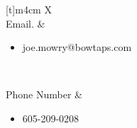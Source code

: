 \begin{center}
\begin{tabularx}{\textwidth}[t]{m{4cm} X}
\hline
{} \\
\hline
Email.  &
\begin{minipage}[t]{\linewidth}%
\begin{itemize}
\item joe.mowry@bowtaps.com\\

\end{itemize} 
\end{minipage}\\

\hline

Phone Number &
\begin{minipage}[t]{\linewidth}%
\begin{itemize}
\item 605-209-0208
\end{itemize} 
\end{minipage}\\



\end{tabularx}
\end{center}